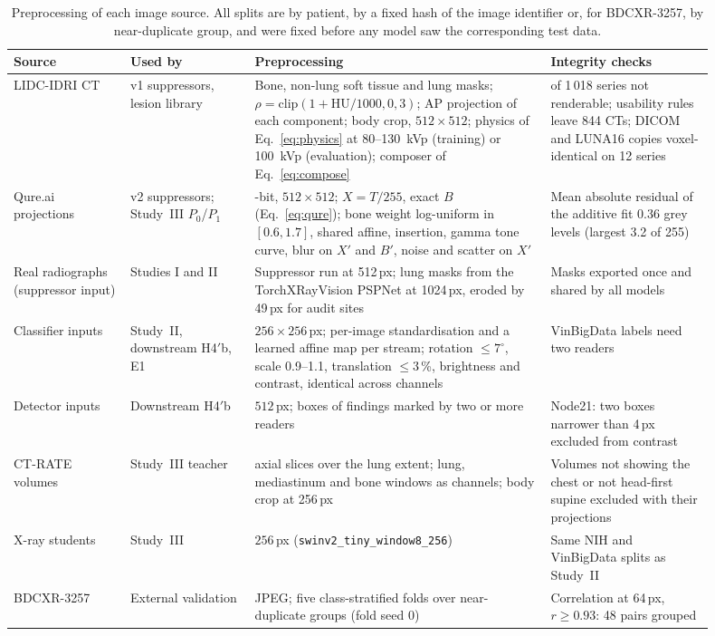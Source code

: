 \begin{table}[htbp]
\centering\small
\renewcommand{\arraystretch}{1.12}
\caption{Preprocessing of each image source. All splits are by patient, by a fixed hash of the image identifier or, for BDCXR-3257, by
near-duplicate group, and were fixed before any model saw the corresponding test data.}
\label{tab:preproc}
\begin{tabular}{@{}>{\raggedright\arraybackslash}p{0.15\linewidth}>{\raggedright\arraybackslash}p{0.16\linewidth}%
>{\raggedright\arraybackslash}p{0.38\linewidth}>{\raggedright\arraybackslash}p{0.21\linewidth}@{}}
\toprule
Source & Used by & Preprocessing & Integrity checks \\
\midrule
LIDC-IDRI CT & v1 suppressors, lesion library & Bone, non-lung soft tissue and lung masks; $\rho=\mathrm{clip}(1+\mathrm{HU}/1000,0,3)$; AP
 projection of each component; body crop, $512\times512$; physics of Eq.~\eqref{eq:physics} at 80--130~kVp (training) or 100~kVp
 (evaluation); composer of Eq.~\eqref{eq:compose} & 18 of 1\,018 series not renderable; usability rules leave 844 CTs; DICOM and LUNA16
 copies voxel-identical on 12 series\\
Qure.ai projections & v2 suppressors; Study~III $P_0$/$P_1$ & 8-bit, $512\times512$; $X=T/255$, exact $B$ (Eq.~\eqref{eq:qure}); bone
 weight log-uniform in $[0.6,1.7]$, shared affine, insertion, gamma tone curve, blur on $X'$ and $B'$, noise and scatter on $X'$ & Mean
 absolute residual of the additive fit 0.36 grey levels (largest 3.2 of 255)\\
Real radiographs (suppressor input) & Studies I and II & Suppressor run at 512\,px; lung masks from the TorchXRayVision PSPNet at
 1024\,px, eroded by 49\,px for audit sites & Masks exported once and shared by all models\\
Classifier inputs & Study~II, downstream H4$'$b, E1 & $256\times256$\,px; per-image standardisation and a learned affine map per stream;
 rotation $\le7^\circ$, scale 0.9--1.1, translation $\le3$\,\%, brightness and contrast, identical across channels & VinBigData labels
 need two readers\\
Detector inputs & Downstream H4$'$b & $512$\,px; boxes of findings marked by two or more readers & Node21: two boxes narrower than 4\,px
 excluded from contrast\\
CT-RATE volumes & Study~III teacher & 24 axial slices over the lung extent; lung, mediastinum and bone windows as channels; body crop at
 256\,px & Volumes not showing the chest or not head-first supine excluded with their projections\\
X-ray students & Study~III & $256$\,px (\texttt{swinv2\_tiny\_window8\_256}) & Same NIH and VinBigData splits as Study~II\\
BDCXR-3257 & External validation & JPEG; five class-stratified folds over near-duplicate groups (fold seed 0) & Correlation at 64\,px,
 $r\ge0.93$: 48 pairs grouped\\
\bottomrule
\end{tabular}
\end{table}

